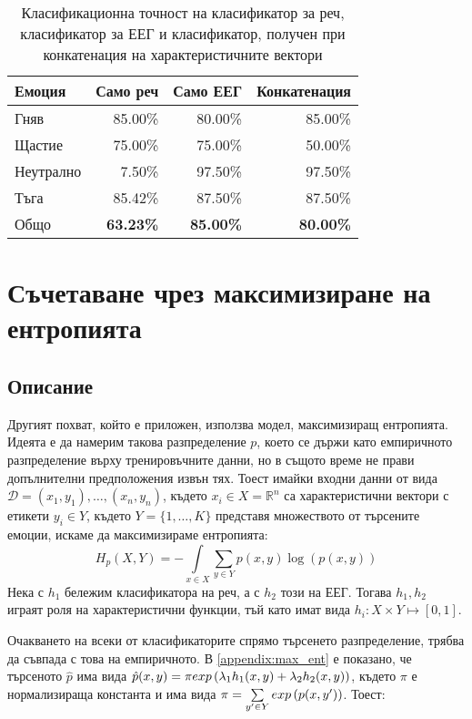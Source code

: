 \documentclass[main.tex]{subfiles}
\begin{document}
\begin{table}[h]
	\begin{center}
		\begin{tabular}{|l|r r r|}
			\hline
			Емоция    & Само реч         & Само ЕЕГ         & Конкатенация     \\
			\hline
			Гняв      & 85.00\%          & 80.00\%          & 85.00\%          \\
			Щастие    & 75.00\%          & 75.00\%          & 50.00\%          \\
			Неутрално & 7.50\%           & 97.50\%          & 97.50\%          \\
			Тъга      & 85.42\%          & 87.50\%          & 87.50\%          \\
			\hline
			\hline
			Общо      & \textbf{63.23\%} & \textbf{85.00\%} & \textbf{80.00\%} \\
			\hline
		\end{tabular}
		\caption{Класификационна точност на класификатор за реч, класификатор за ЕЕГ и класификатор, получен при конкатенация на характеристичните вектори}
		\label{tab:double:results:01}
	\end{center}
\end{table}

\section{Съчетаване чрез максимизиране на ентропията}
\subsection{Описание}
Другият похват, който е приложен, използва модел, максимизиращ ентропията. Идеята е да намерим такова разпределение $p$, което се държи като емпиричното разпределение върху тренировъчните данни, но в същото време не прави допълнителни предположения извън тях.
Тоест имайки входни данни от вида $\mathcal{D} = (x_1, y_1),\ldots, (x_n, y_n)$, където $x_i \in X = \mathbb{R}^n$ са характеристични вектори с етикети $y_i \in Y$, където $Y = \{1,\ldots, K\}$ представя множеството от търсените емоции, искаме да максимизираме ентропията:
\[
	H_p(X, Y) = - \int\limits_{x\in X} \sum\limits_{y \in Y} p(x, y) \log(p(x, y))
\]
Нека с $h_1$ бележим класификатора на реч, а с $h_2$ този на ЕЕГ. Тогава $h_1, h_2$ играят роля на характеристични функции, тъй като имат вида $h_i: X \times Y \mapsto [0, 1]$.

Очакването на всеки от класификаторите спрямо търсенето разпределение, трябва да съвпада с това на емпиричното. В \autoref{appendix:max_ent} е показано, че търсеното $\hat{p}$ има вида $\hat{p}(x, y) = \pi exp\left(\lambda_1 h_1(x, y) + \lambda_2 h_2(x, y)\right)$,
където $\pi$ е нормализираща константа и има вида $\pi = \sum\limits_{y' \in Y} exp\left(p(x, y')\right)$. Тоест:
\end{document}
